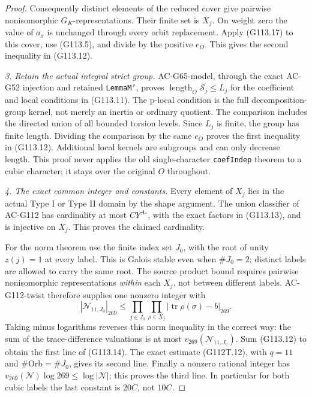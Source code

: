 \begin{proof}
Consequently distinct elements of the reduced cover give pairwise
nonisomorphic \(G_K\)-representations.  Their finite set is
\(X_j\).  On weight zero the value of \(a_\sigma\) is unchanged
through every orbit replacement.  Apply (G113.17) to this cover,
use (G113.5), and divide by the positive \(e_O\).  This gives
the second inequality in (G113.12).

\emph{3. Retain the actual integral strict group.}
AC-G65-model, through the exact AC-G52 injection and retained
\texttt{LemmaM'}, proves
\(\operatorname{length}_O\mathcal S_j\le L_j\) for the
coefficient and local conditions in (G113.11).  The p-local
condition is the full decomposition-group kernel, not merely an
inertia or ordinary quotient.  The comparison includes the
directed union of all bounded torsion levels.  Since \(L_j\) is
finite, the group has finite length.  Dividing the comparison by
the same \(e_O\) proves the first inequality in (G113.12).
Additional local kernels are subgroups and can only decrease
length.  This proof never applies the old single-character
\texttt{coefIndep} theorem to a cubic character; it stays over
the original \(O\) throughout.

\emph{4. The exact common integer and constants.}
Every element of \(X_j\) lies in the actual Type I or Type II
domain by the shape argument.  The union classifier of AC-G112
has cardinality at most \(CY^{A_*}\), with the exact factors
in (G113.13), and is injective on \(X_j\).  This proves the
claimed cardinality.

For the norm theorem use the finite index set \(J_0\), with the
root of unity \(z(j)=1\) at every label.  This is Galois stable
even when \(\#J_0=2\); distinct labels are allowed to carry
the same root.  The source product bound requires pairwise
nonisomorphic representations \emph{within} each \(X_j\),
not between different labels.  AC-G112-twist therefore supplies
one nonzero integer with
\[
 |\mathcal N_{11,J_0}|_{269}\le
       \prod_{j\in J_0}\prod_{\rho\in X_j}
          |\operatorname{tr}\rho(\sigma)-b|_{269}.
 \tag{G113.18}
\]
Taking minus logarithms reverses this norm inequality in the
correct way: the sum of the trace-difference valuations is at
most \(v_{269}(\mathcal N_{11,J_0})\).  Sum (G113.12) to
obtain the first line of (G113.14).  The exact estimate
(G112T.12), with \(q=11\) and \(\#\mathrm{Orb}=\#J_0\),
gives its second line.  Finally a nonzero rational integer has
\(v_{269}(\mathcal N)\log269\le\log|\mathcal N|\);
this proves the third line.  In particular for both cubic labels
the last constant is \(20C\), not \(10C\).


\end{proof}
